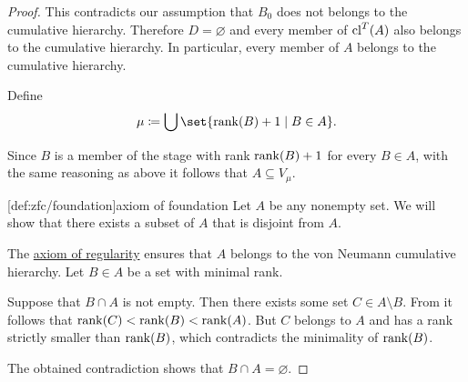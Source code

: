 \begin{proof}
  This contradicts our assumption that \( B_0 \) does not belongs to the cumulative hierarchy. Therefore \( D = \varnothing \) and every member of \( \operatorname{cl}^T(A) \) also belongs to the cumulative hierarchy. In particular, every member of \( A \) belongs to the cumulative hierarchy.

  Define
  \begin{equation*}
    \mu \coloneqq \bigcup\set{ \rank(B) + 1 \given B \in A }.
  \end{equation*}

  Since \( B \) is a member of the stage with rank \( \operatorname{rank}(B) + 1 \) for every \( B \in A \), with the same reasoning as above it follows that \( A \subseteq V_\mu \).

  [def:zfc/foundation]{axiom of foundation} Let \( A \) be any nonempty set. We will show that there exists a subset of \( A \) that is disjoint from \( A \).

  The \hyperref[def:axiom_of_regularity]{axiom of regularity} ensures that \( A \) belongs to the von Neumann cumulative hierarchy. Let \( B \in A \) be a set with minimal rank.

  Suppose that \( B \cap A \) is not empty. Then there exists some set \( C \in A \setminus B \). From  it follows that \( \operatorname{rank}(C) < \operatorname{rank}(B) < \operatorname{rank}(A) \). But \( C \) belongs to \( A \) and has a rank strictly smaller than \( \operatorname{rank}(B) \), which contradicts the minimality of \( \operatorname{rank}(B) \).

  The obtained contradiction shows that \( B \cap A = \varnothing \).
\end{proof}

